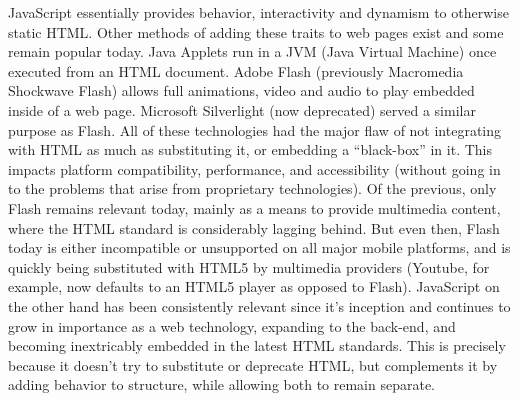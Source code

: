 JavaScript essentially provides behavior, interactivity and dynamism to otherwise static HTML. Other methods of adding
these traits to web pages exist and some remain popular today. Java Applets run in a JVM (Java Virtual Machine) once
executed from an HTML document. Adobe Flash (previously Macromedia Shockwave Flash) allows full animations, video and
audio to play embedded inside of a web page. Microsoft Silverlight (now deprecated) served a similar purpose as Flash.
All of these technologies had the major flaw of not integrating with HTML as much as substituting it, or embedding a
``black-box'' in it. This impacts platform compatibility, performance, and accessibility (without going in to the
problems that arise from proprietary technologies). Of the previous, only Flash remains relevant today, mainly as a means
to provide multimedia content, where the HTML standard is considerably lagging behind. But even then, Flash today is
either incompatible or unsupported on all major mobile platforms, and is quickly being substituted with HTML5 by
multimedia providers (Youtube, for example, now defaults to an HTML5 player as opposed to Flash). JavaScript on the other
hand has been consistently relevant since it's inception and continues to grow in importance as a web technology,
expanding to the back-end, and becoming inextricably embedded in the latest HTML standards. This is precisely because it
doesn't try to substitute or deprecate HTML, but complements it by adding behavior to structure, while allowing both to
remain separate.
